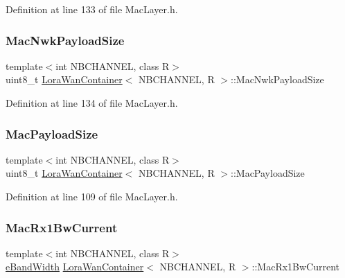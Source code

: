Definition at line 133 of file Mac\+Layer.\+h.

\mbox{\label{class_lora_wan_container_aecdf27c0dbb1e17533574ed76ec62e49}} 
\subsubsection{\texorpdfstring{Mac\+Nwk\+Payload\+Size}{MacNwkPayloadSize}}
{\footnotesize\ttfamily template$<$int N\+B\+C\+H\+A\+N\+N\+EL, class R$>$ \\
uint8\+\_\+t \mbox{\hyperlink{class_lora_wan_container}{Lora\+Wan\+Container}}$<$ N\+B\+C\+H\+A\+N\+N\+EL, R $>$\+::Mac\+Nwk\+Payload\+Size}



Definition at line 134 of file Mac\+Layer.\+h.

\mbox{\label{class_lora_wan_container_a7a5629712138aea035101727cefe9932}} 
\subsubsection{\texorpdfstring{Mac\+Payload\+Size}{MacPayloadSize}}
{\footnotesize\ttfamily template$<$int N\+B\+C\+H\+A\+N\+N\+EL, class R$>$ \\
uint8\+\_\+t \mbox{\hyperlink{class_lora_wan_container}{Lora\+Wan\+Container}}$<$ N\+B\+C\+H\+A\+N\+N\+EL, R $>$\+::Mac\+Payload\+Size}



Definition at line 109 of file Mac\+Layer.\+h.

\mbox{\label{class_lora_wan_container_a8a9873a1e1bde19470d537abf936e30c}} 
\subsubsection{\texorpdfstring{Mac\+Rx1\+Bw\+Current}{MacRx1BwCurrent}}
{\footnotesize\ttfamily template$<$int N\+B\+C\+H\+A\+N\+N\+EL, class R$>$ \\
\mbox{\hyperlink{_define_8h_a6cbb491180e131f374cdbe63880c85e1}{e\+Band\+Width}} \mbox{\hyperlink{class_lora_wan_container}{Lora\+Wan\+Container}}$<$ N\+B\+C\+H\+A\+N\+N\+EL, R $>$\+::Mac\+Rx1\+Bw\+Current\hspace{0.3cm}{\ttfamily [protected]}}



